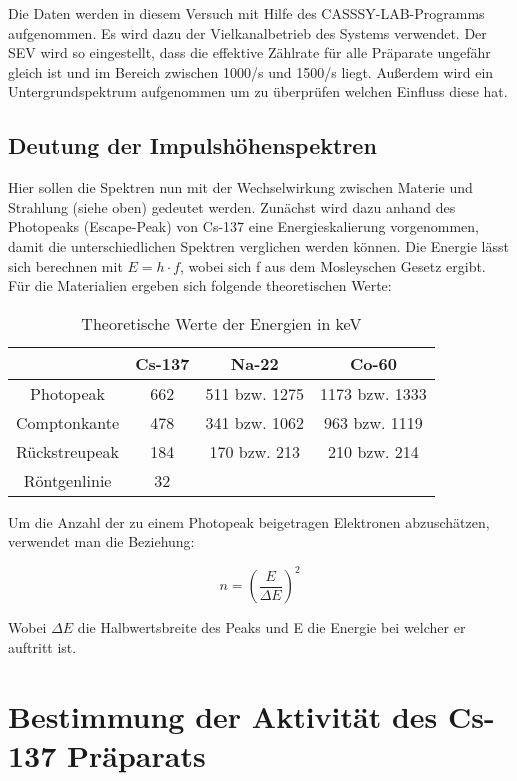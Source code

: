 \documentclass[a4paper,titlepage]{scrartcl}
\numberwithin{equation}{section}
\begin{document}
Die Daten werden in diesem Versuch mit Hilfe des CASSSY-LAB-Programms aufgenommen. Es wird dazu der Vielkanalbetrieb des Systems verwendet. Der SEV wird so eingestellt, dass die effektive Zählrate für alle Präparate ungefähr gleich ist und im Bereich zwischen 1000/s und 1500/s liegt. Außerdem wird ein Untergrundspektrum aufgenommen um zu überprüfen welchen Einfluss diese hat.

\subsection{Deutung der Impulshöhenspektren}

Hier sollen die Spektren nun mit der Wechselwirkung zwischen Materie und Strahlung (siehe oben) gedeutet werden. Zunächst wird dazu anhand des Photopeaks (Escape-Peak) von Cs-137 eine Energieskalierung vorgenommen, damit die unterschiedlichen Spektren verglichen werden können. Die Energie  lässt sich berechnen mit $E= h \cdot f$, wobei sich f aus dem Mosleyschen Gesetz ergibt.\\
Für die Materialien ergeben sich folgende theoretischen Werte:

\begin{table}[H]
\centering
\caption{Theoretische Werte der Energien in keV}
	\begin{tabular}{c|c c c }
    & Cs-137 & Na-22 & Co-60 \\
		\hline
		Photopeak & 662 & 511 bzw. 1275 & 1173 bzw. 1333 \\
		Comptonkante & 478 & 341 bzw. 1062 & 963 bzw. 1119 \\
	    Rückstreupeak & 184 & 170 bzw. 213 & 210 bzw. 214 \\
	    Röntgenlinie & 32 & & \\
	\end{tabular}
\end{table}

Um die Anzahl der zu einem Photopeak beigetragen Elektronen abzuschätzen, verwendet man die Beziehung:

\begin{equation*}
n=\left( \frac{E}{\Delta E}\right)^2
\end{equation*}

Wobei $\Delta E$ die Halbwertsbreite des Peaks und E die Energie bei welcher er auftritt ist.

\section{Bestimmung der Aktivität des Cs-137 Präparats}
\end{document}

